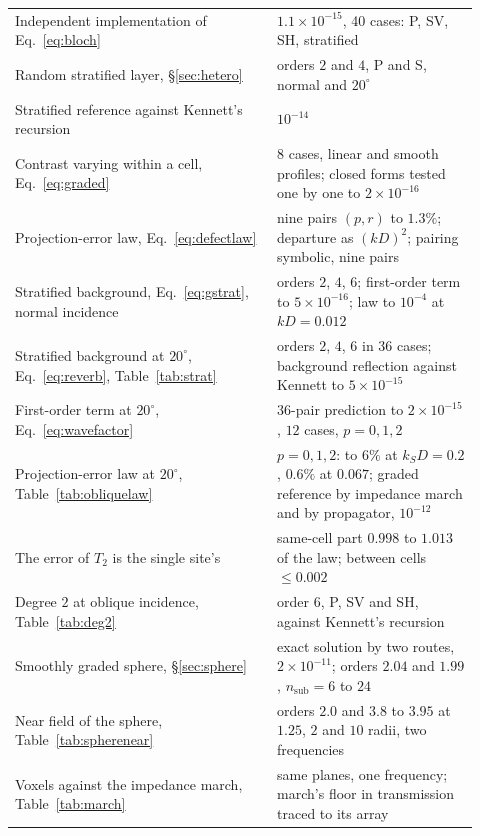 \documentclass[11pt,a4paper]{article}
\begin{document}
\begin{table}[htbp]
\begin{tabular}{@{}>{\raggedright\arraybackslash}p{0.52\linewidth}>{\raggedright\arraybackslash}p{0.40\linewidth}@{}}
Independent implementation of Eq.~\eqref{eq:bloch} & $1.1\times10^{-15}$, 40 cases: P, SV, SH, stratified \\
Random stratified layer, \S\ref{sec:hetero} & orders $2$ and $4$, P and S, normal and $20^\circ$ \\
Stratified reference against Kennett's recursion & $10^{-14}$ \\
Contrast varying within a cell, Eq.~\eqref{eq:graded} & $8$ cases, linear and smooth profiles; closed forms tested one by one to $2\times10^{-16}$ \\
Projection-error law, Eq.~\eqref{eq:defectlaw} & nine pairs $(p,r)$ to $1.3\%$; departure as $(kD)^2$; pairing symbolic, nine pairs \\
Stratified background, Eq.~\eqref{eq:gstrat}, normal incidence & orders $2$, $4$, $6$; first-order term to $5\times10^{-16}$; law to $10^{-4}$ at $kD=0.012$ \\
Stratified background at $20^\circ$, Eq.~\eqref{eq:reverb}, Table~\ref{tab:strat} & orders $2$, $4$, $6$ in $36$ cases; background reflection against Kennett to $5\times10^{-15}$ \\
First-order term at $20^\circ$, Eq.~\eqref{eq:wavefactor} & $36$-pair prediction to $2\times10^{-15}$, $12$ cases, $p=0,1,2$ \\
Projection-error law at $20^\circ$, Table~\ref{tab:obliquelaw} & $p=0,1,2$: to $6\%$ at $k_SD=0.2$, $0.6\%$ at $0.067$; graded reference by impedance march and by propagator, $10^{-12}$ \\
The error of $T_2$ is the single site's & same-cell part $0.998$ to $1.013$ of the law; between cells $\le0.002$ \\
Degree $2$ at oblique incidence, Table~\ref{tab:deg2} & order $6$, P, SV and SH, against Kennett's recursion \\
Smoothly graded sphere, \S\ref{sec:sphere} & exact solution by two routes, $2\times10^{-11}$; orders $2.04$ and $1.99$, $n_{\mathrm{sub}}=6$ to $24$ \\
Near field of the sphere, Table~\ref{tab:spherenear} & orders $2.0$ and $3.8$ to $3.95$ at $1.25$, $2$ and $10$ radii, two frequencies \\
Voxels against the impedance march, Table~\ref{tab:march} & same planes, one frequency; march's floor in transmission traced to its array \\
\bottomrule
\end{tabular}
\end{table}

\FloatBarrier
\end{document}
